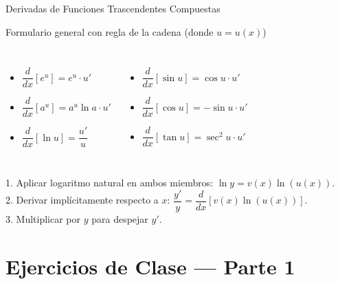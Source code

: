 \documentclass[aspectratio=169]{beamer}
\begin{document}
\begin{frame}{Derivadas de Funciones Trascendentes Compuestas}
  \begin{block}{Formulario general con regla de la cadena (donde $u = u(x)$)}
    \begin{columns}[T]
      \begin{itemize}
        \item $\dfrac{d}{dx}[e^u] = e^u \cdot u'$
        \item $\dfrac{d}{dx}[a^u] = a^u \ln a \cdot u'$
        \item $\dfrac{d}{dx}[\ln u] = \dfrac{u'}{u}$
      \end{itemize}
      \begin{itemize}
        \item $\dfrac{d}{dx}[\sin u] = \cos u \cdot u'$
        \item $\dfrac{d}{dx}[\cos u] = -\sin u \cdot u'$
        \item $\dfrac{d}{dx}[\tan u] = \sec^2 u \cdot u'$
      \end{itemize}
    \end{columns}
  \end{block}

  \vspace{4pt}
  \begin{mwpasos}[{Técnica de Derivación Logarítmica (para $y = [u(x)]^{v(x)}$)}]
    1. Aplicar logaritmo natural en ambos miembros: $\ln y = v(x) \ln(u(x))$. \\
    2. Derivar implícitamente respecto a $x$: $\dfrac{y'}{y} = \dfrac{d}{dx}[v(x) \ln(u(x))]$. \\
    3. Multiplicar por $y$ para despejar $y'$.
  \end{mwpasos}
\end{frame}



\section{Ejercicios de Clase — Parte 1}
\end{document}
